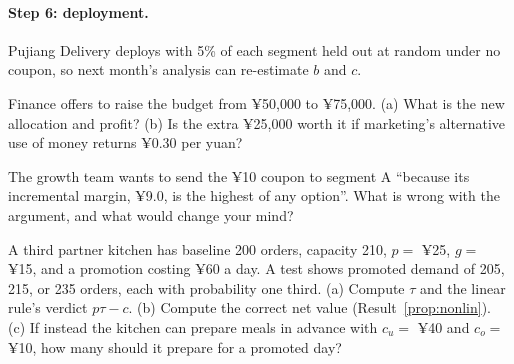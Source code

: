 \documentclass[11pt]{article}
\begin{document}
\paragraph{Step 6: deployment.} Pujiang Delivery deploys with 5\% of each segment held out at random under no coupon, so next month's
analysis can re-estimate $b$ and $c$.

\begin{exercise}[computation]
Finance offers to raise the budget from ¥50{,}000 to ¥75{,}000. (a) What is the new allocation and profit? (b) Is the extra ¥25{,}000
worth it if marketing's alternative use of money returns ¥0.30 per yuan?
\end{exercise}

\begin{exercise}[judgment]
The growth team wants to send the ¥10 coupon to segment A ``because its incremental margin, ¥9.0, is the highest of any option''.
What is wrong with the argument, and what would change your mind?
\end{exercise}

\begin{exercise}[computation]
A third partner kitchen has baseline 200 orders, capacity 210, $p = $ ¥25, $g = $ ¥15, and a promotion costing ¥60 a day. A test
shows promoted demand of 205, 215, or 235 orders, each with probability one third. (a) Compute $\tau$ and the linear rule's
verdict $p\tau - c$. (b) Compute the correct net value (Result~\ref{prop:nonlin}). (c) If instead the kitchen can prepare meals in
advance with $c_u = $ ¥40 and $c_o = $ ¥10, how many should it prepare for a promoted day?
\end{exercise}
\end{document}
